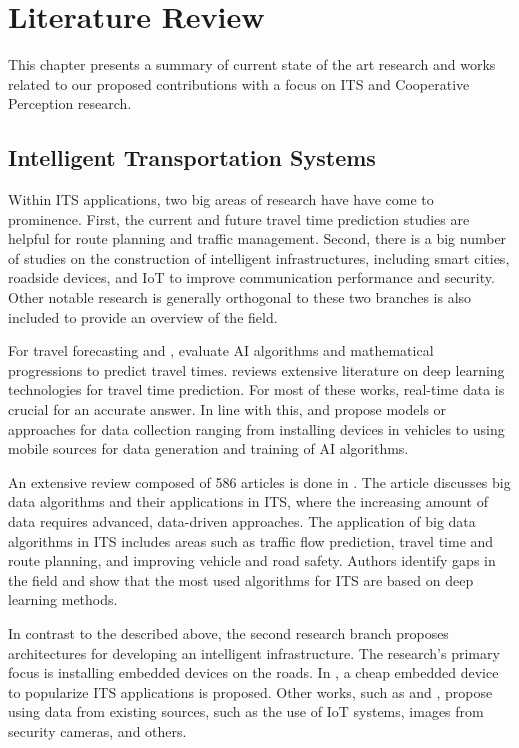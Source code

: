 \chapter{Literature Review}

This chapter presents a summary of current state of the art research and  works related to our proposed contributions with a focus on ITS and Cooperative Perception research.

\section{Intelligent Transportation Systems}

Within ITS applications, two big areas of research have have come to prominence. First, the current and future travel time prediction studies are helpful for route planning and traffic management. Second, there is a big number of studies on the construction of intelligent infrastructures, including smart cities, roadside devices, and IoT to improve communication performance and security. Other notable research is generally orthogonal to these two branches is also included to provide an overview of the field.

For travel forecasting \cite{chen2022constructing} and \cite{bhatia2022intelligent}, evaluate AI algorithms and mathematical progressions to predict travel times. \cite{haydari2020deep} reviews extensive literature on deep learning technologies for travel time prediction. For most of these works, real-time data is crucial for an accurate answer. In line with this, \cite{liu2018development} and \cite{wang2021trusted} propose models or approaches for data collection ranging from installing devices in vehicles to using mobile sources for data generation and training of AI algorithms.

An extensive review composed of 586 articles is done in \cite{kaffash2021big}. The article discusses big data algorithms and their applications in ITS, where the increasing amount of data requires advanced, data-driven approaches. The application of big data algorithms in ITS includes areas such as traffic flow prediction, travel time and route planning, and improving vehicle and road safety. Authors identify gaps in the field and show that the most used algorithms for ITS are based on deep learning methods.

In contrast to the described above, the second research branch proposes architectures for developing an intelligent infrastructure. The research's primary focus is installing embedded devices on the roads. In \cite{zhu2018big}, a cheap embedded device to popularize ITS applications is proposed. Other works, such as \cite{wang2021trusted} and \cite{guillen2021intelligent, garg2018deep, liang2019deep}, propose using data from existing sources, such as the use of IoT systems, images from security cameras, and others.

